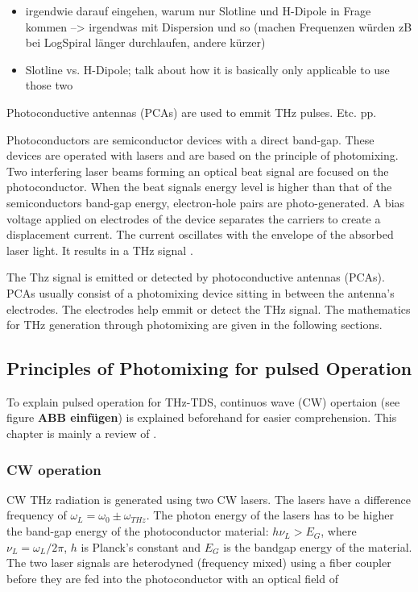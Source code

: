 \begin{itemize}
	\item irgendwie darauf eingehen, warum nur Slotline und H-Dipole in Frage kommen
	--> irgendwas mit Dispersion und so (machen Frequenzen würden zB bei LogSpiral länger durchlaufen, andere kürzer) 
\end{itemize}
\begin{itemize}
	\item Slotline vs. H-Dipole; talk about how it is basically only
	applicable to use those two 
\end{itemize}

Photoconductive antennas (PCAs) are used to emmit THz pulses. Etc. pp. 

Photoconductors are semiconductor devices with a direct band-gap. These devices are operated with lasers and are based on the principle of photomixing. Two interfering laser beams forming an optical beat signal are focused on the photoconductor. When the beat signals energy level is higher than that of the semiconductors band-gap energy, electron-hole pairs are photo-generated. A bias voltage applied on electrodes of the device separates the carriers to create a displacement current. The current oscillates with the envelope of the absorbed laser light. It results in a THz signal \cite{nandiErAsInAlGaAsPhotoconductors2021}. 

The Thz signal is emitted or detected by photoconductive antennas (PCAs). PCAs usually consist of a photomixing device sitting in between the antenna's electrodes. The electrodes help emmit or detect the THz signal. The mathematics for THz generation through photomixing are given in the following sections.


\subsection{Principles of Photomixing for pulsed Operation}
To explain pulsed operation for THz-TDS, continuos wave (CW) opertaion (see figure \textbf{ABB einfügen}) is explained beforehand for easier comprehension. This chapter is mainly a review of \cite{nandiErAsInAlGaAsPhotoconductors2021,faridiPulsedFreeSpace2023,preuPrinciplesTHzGeneration2015}.

\subsubsection{CW operation}
CW THz radiation is generated using two CW lasers. The lasers have a difference frequency of $\omega_L = \omega_0 \pm \omega_{THz}$. The photon energy of the lasers has to be higher the band-gap energy of the photoconductor material: $h\nu_L > E_G$, 
where $\nu_L = \omega_L / 2\pi$, $h$ is Planck’s constant and $E_G$ is the bandgap energy of the material. The two laser signals are heterodyned (frequency mixed) using a fiber coupler before they are fed into the photoconductor with an optical field of


